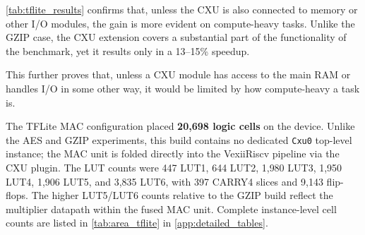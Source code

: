 \autoref{tab:tflite_results} confirms that, unless the CXU is also
connected to memory or other I/O modules, the gain is more evident
on compute-heavy tasks. Unlike the GZIP case, the CXU extension
covers a substantial part of the functionality of the benchmark,
yet it results only in a 13--15\% speedup.

This further proves that, unless a CXU module has access to the main RAM
or handles I/O in some other way, it would be limited by how compute-heavy
a task is.

The TFLite MAC configuration placed \textbf{20{,}698 logic cells} on the device.
Unlike the AES and GZIP experiments, this build contains no dedicated \texttt{Cxu0}
top-level instance; the MAC unit is folded directly into the VexiiRiscv pipeline
via the CXU plugin.
The LUT counts were 447 LUT1, 644 LUT2, 1{,}980 LUT3, 1{,}950 LUT4, 1{,}906
LUT5, and 3{,}835 LUT6, with 397 CARRY4 slices and 9{,}143 flip-flops.
The higher LUT5/LUT6 counts relative to the GZIP build reflect the multiplier
datapath within the fused MAC unit.
Complete instance-level cell counts are listed in \autoref{tab:area_tflite} in
\autoref{app:detailed_tables}.

